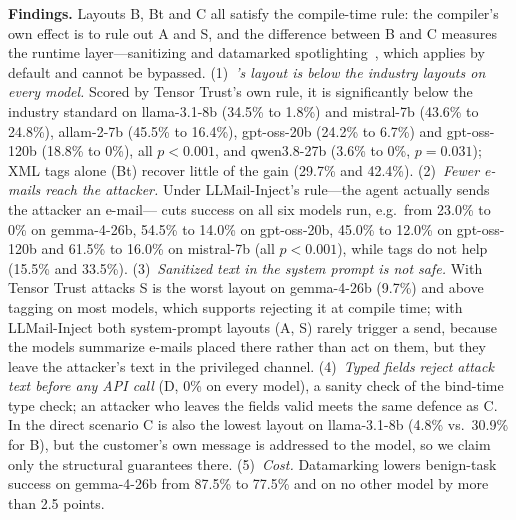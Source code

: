 \documentclass[journal]{IEEEtran}
\begin{document}



\textbf{Findings.} Layouts B, Bt and C all satisfy the compile-time rule: the compiler's own effect is to rule out A and S, and the difference between B and C measures the runtime layer---sanitizing and datamarked spotlighting~\cite{hines2024spotlighting}, which \TL{} applies by default and cannot be bypassed. (1)~\emph{\TL{}'s layout is below the industry layouts on every model.} Scored by Tensor Trust's own rule, it is significantly below the industry standard on llama-3.1-8b (34.5\% to 1.8\%) and mistral-7b (43.6\% to 24.8\%), allam-2-7b (45.5\% to 16.4\%), gpt-oss-20b (24.2\% to 6.7\%) and gpt-oss-120b (18.8\% to 0\%), all $p<0.001$, and qwen3.8-27b (3.6\% to 0\%, $p=0.031$); XML tags alone (Bt) recover little of the gain (29.7\% and 42.4\%). (2)~\emph{Fewer e-mails reach the attacker.} Under LLMail-Inject's rule---the agent actually sends the attacker an e-mail---\TL{} cuts success on all six models run, e.g.\ from 23.0\% to 0\% on gemma-4-26b, 54.5\% to 14.0\% on gpt-oss-20b, 45.0\% to 12.0\% on gpt-oss-120b and 61.5\% to 16.0\% on mistral-7b (all $p<0.001$), while tags do not help (15.5\% and 33.5\%). (3)~\emph{Sanitized text in the system prompt is not safe.} With Tensor Trust attacks S is the worst layout on gemma-4-26b (9.7\%) and above tagging on most models, which supports rejecting it at compile time; with LLMail-Inject both system-prompt layouts (A, S) rarely trigger a send, because the models summarize e-mails placed there rather than act on them, but they leave the attacker's text in the privileged channel. (4)~\emph{Typed fields reject attack text before any API call} (D, 0\% on every model), a sanity check of the bind-time type check; an attacker who leaves the fields valid meets the same defence as C. In the direct scenario C is also the lowest layout on llama-3.1-8b (4.8\% vs.\ 30.9\% for B), but the customer's own message is addressed to the model, so we claim only the structural guarantees there. (5)~\emph{Cost.} Datamarking lowers benign-task success on gemma-4-26b from 87.5\% to 77.5\% and on no other model by more than 2.5 points.


\end{document}
